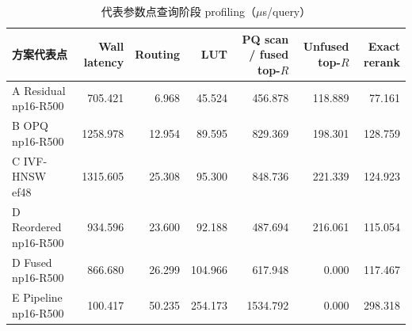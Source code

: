 \documentclass[a4paper]{article}
\begin{document}
\begin{table}[H]
\centering
\scriptsize
\caption{代表参数点查询阶段 profiling（$\mu$s/query）}
\label{tab:advanced-profile}
\begin{tabularx}{\textwidth}{Xrrrrrr}
\toprule
方案代表点 & Wall latency & Routing & LUT & PQ scan / fused top-$R$ & Unfused top-$R$ & Exact rerank \\
\midrule
A Residual np16-R500 & 705.421 & 6.968 & 45.524 & 456.878 & 118.889 & 77.161 \\
B OPQ np16-R500 & 1258.978 & 12.954 & 89.595 & 829.369 & 198.301 & 128.759 \\
C IVF-HNSW ef48 & 1315.605 & 25.308 & 95.300 & 848.736 & 221.339 & 124.923 \\
D Reordered np16-R500 & 934.596 & 23.600 & 92.188 & 487.694 & 216.061 & 115.054 \\
D Fused np16-R500 & 866.680 & 26.299 & 104.966 & 617.948 & 0.000 & 117.467 \\
E Pipeline np16-R500 & 100.417 & 50.235 & 254.173 & 1534.792 & 0.000 & 298.318 \\
\bottomrule
\end{tabularx}
\end{table}
\end{document}
